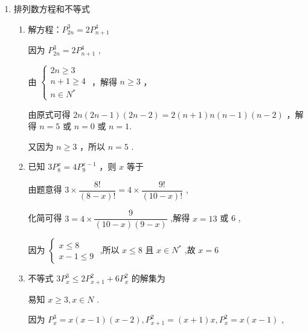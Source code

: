 \begin{enumerate}
\begin{enumerate}
\begin{jieda}
\begin{dingautolist}{172}
            \end{dingautolist}
        \end{jieda}
    \end{enumerate}
    
    \item 排列数方程和不等式
    \begin{enumerate}
        \item 解方程：$P_{2n}^{3} = 2P_{n + 1}^{4}$
        \begin{jieda}
            因为 $P_{2n}^{3} = 2P_{n + 1}^{4}$ ,

            由 $\left\{  \begin{array}{l} {2n} \geq  3 \\  n + 1 \geq  4 \\  n \in  {{N}}^{ * } \end{array}\right.$ ，解得 $n \geq  3$ ，
            
            由原式可得 ${2n}\left( {{2n} - 1}\right) \left( {{2n} - 2}\right)  = 2\left( {n + 1}\right) n\left( {n - 1}\right) \left( {n - 2}\right)$ ，解得 $n = 5$ 或 $n = 0$ 或 $n = 1$.
            
            又因为 $n \geq  3$ ，所以 $n = 5$ .
        \end{jieda}
        \item 已知 $3P_{8}^{x} = 4P_{9}^{x - 1}$ ，则 $x$ 等于
        \begin{jieda}
            由题意得 $3 \times  \dfrac{8!}{\left( {8 - x}\right) !} = 4 \times  \dfrac{9!}{\left( {{10} - x}\right) !}$ ,
            
            化简可得 $3 = 4 \times  \dfrac{9}{\left( {{10} - x}\right) \left( {9 - x}\right) }$ ,解得 $x = {13}$ 或 6 ,
            
            因为 $\left\{  \begin{matrix} x \leq  8 \\  x - 1 \leq  9 \end{matrix}\right.$ ,所以 $x \leq  8$ 且 $x \in  {N}^{ * }$ ,故 $x = 6$ 
        \end{jieda}
        \item 不等式 $3P_{x}^{3} \leq  2P_{x + 1}^{2} + 6P_{x}^{2}$ 的解集为
        \begin{jieda}
            易知 $x \geq  3,x \in  N$ .
            
            因为 $P_{x}^{3} = x\left( {x - 1}\right) \left( {x - 2}\right) ,P_{x + 1}^{2} = \left( {x + 1}\right) x,P_{x}^{2} = x\left( {x - 1}\right)$ ,
            

\end{jieda}
\end{enumerate}
\end{enumerate}
